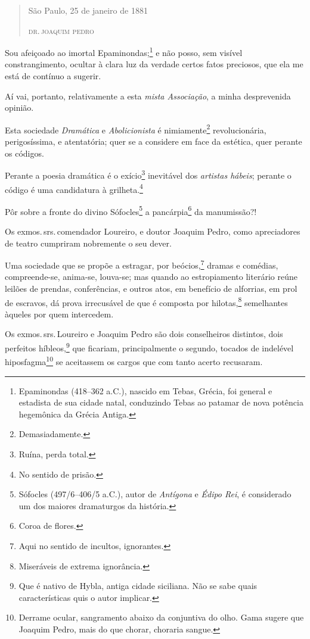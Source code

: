 {\begin{quote}
\hfill{}São Paulo, 25 de janeiro de 1881

\hfill\textsc{dr.\,joaquim pedro}
\end{quote}

Sou afeiçoado ao imortal Epaminondas;\footnote{Epaminondas (418--362 a.C.), nascido em Tebas, Grécia, foi general e estadista de \label{epaminondas} 
  sua cidade natal, conduzindo Tebas ao patamar de nova
  potência hegemônica da Grécia Antiga.} e não posso, sem visível
constrangimento, ocultar à clara luz da verdade certos fatos preciosos,
que ela me está de contínuo a sugerir.

Aí vai, portanto, relativamente a esta \emph{mista Associação}, a minha
desprevenida opinião.

Esta sociedade \emph{Dramática} e \emph{Abolicionista} é
nimiamente\footnote{Demasiadamente.} revolucionária, perigosíssima, e
atentatória; quer se a considere em face da estética, quer perante os
códigos.

Perante a poesia dramática é o exício\footnote{Ruína, perda total.}
inevitável dos \emph{artistas hábeis}; perante o código é uma
candidatura à grilheta.\footnote{No sentido de prisão.}

Pôr sobre a fronte do divino Sófocles\footnote{Sófocles (497/6--406/5 a.C.), autor de \emph{Antígona} e \emph{Édipo Rei}, é
  considerado um dos maiores dramaturgos da história.} a
pancárpia\footnote{Coroa de flores.} da manumissão?!

Os exmos.\,srs.\,comendador Loureiro, e doutor Joaquim Pedro, como
apreciadores de teatro cumpriram nobremente o seu dever.

Uma sociedade que se propõe a estragar, por beócios,\footnote{Aqui no
  sentido de incultos, ignorantes.} dramas e comédias, compreende-se,
anima-se, louva-se; mas quando ao estropiamento literário reúne leilões
de prendas, conferências, e outros atos, em benefício de alforrias, em
prol de escravos, dá prova irrecusável de que é composta por
hilotas,\footnote{Miseráveis de extrema ignorância.} semelhantes
àqueles por quem intercedem.

Os exmos.\,srs.\,Loureiro e Joaquim Pedro são dois conselheiros distintos,
dois perfeitos híbleos,\footnote{Que é nativo de Hybla, antiga cidade
  siciliana. Não se sabe quais características quis o autor implicar.}
que ficariam, principalmente o segundo, tocados de indelével
hiposfagma\footnote{Derrame ocular, sangramento abaixo da conjuntiva
  do olho. Gama sugere que Joaquim Pedro, mais do que chorar, choraria
  sangue.} se aceitassem os cargos que com tanto acerto recusaram.

}
